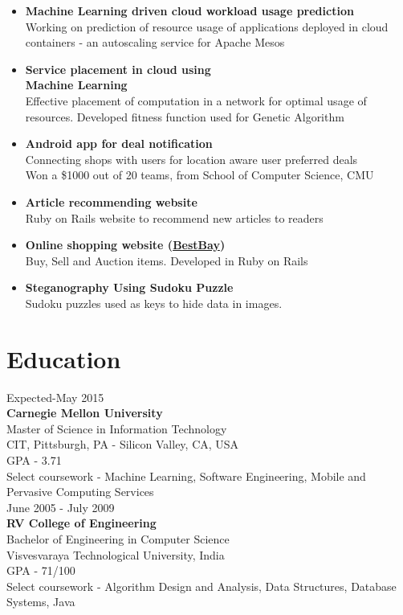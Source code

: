 \documentclass{tccv}
\begin{document}
\begin{itemize}

\item\textbf{Machine Learning driven cloud workload usage prediction}\\
     {Working on prediction of resource usage of applications deployed in cloud containers - an autoscaling service for Apache Mesos}
\item\textbf{Service placement in cloud using \\Machine Learning}\\
     {Effective placement of computation in a network for optimal usage of resources. Developed fitness function 
used for Genetic Algorithm}

\item\textbf{Android app for deal notification}\\
     {Connecting shops with users for location aware user preferred deals}\\
     Won a \$1000 {} out of 20 teams, from School of Computer Science, CMU

\item\textbf{Article recommending website}\\
     {Ruby on Rails website to recommend new articles to readers}
\item\textbf{Online shopping website (\href{http://rhbestbay.herokuapp.com/}{BestBay})}\\
     {Buy, Sell and Auction items. Developed in Ruby on Rails}
\item\textbf{Steganography Using Sudoku Puzzle}\\
     {Sudoku puzzles used as keys to hide data in images.
     }

\end{itemize}

\section{Education}

{\hfill\sc Expected-May 2015}\\
\textbf{Carnegie Mellon University}\\ 
Master of Science in Information Technology\\
CIT, Pittsburgh, PA - Silicon Valley, CA, USA\\
GPA - 3.71\\
Select coursework - Machine Learning, Software Engineering, Mobile and Pervasive Computing Services\\

{\hfill\sc June 2005 - July 2009}\\
\textbf{RV College of Engineering}\\
Bachelor of Engineering in Computer Science\\
Visvesvaraya Technological University, India\\
GPA - 71/100\\
Select coursework - Algorithm Design and Analysis, Data Structures, Database Systems, Java\\ 
\end{document}

